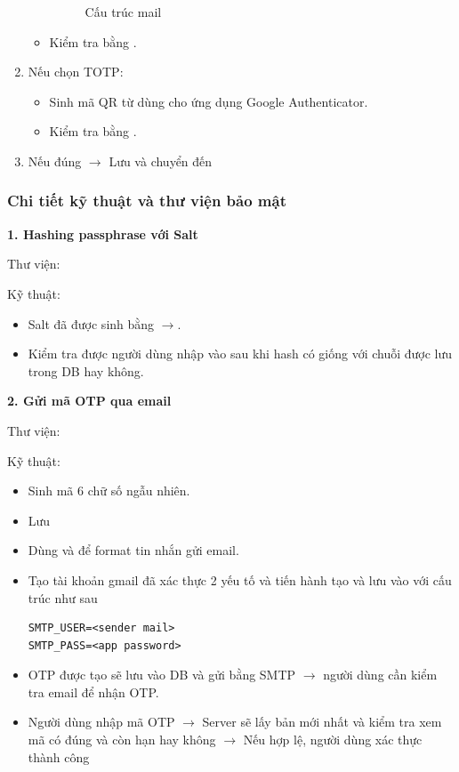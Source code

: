 \begin{enumerate}
\begin{itemize}
\begin{figure}[H]
        \caption{Cấu trúc mail}
        \label{fig:mail_recovery_ui}
        \end{figure}
        \item Kiểm tra bằng .
    \end{itemize}
    \item Nếu chọn TOTP:
    \begin{itemize}
        \item Sinh mã QR từ  \textrightarrow{} dùng cho ứng dụng Google Authenticator.
        \item Kiểm tra bằng .
    \end{itemize}
    \item Nếu đúng $\rightarrow$ Lưu  và chuyển đến 
\end{enumerate}

\subsubsection*{Chi tiết kỹ thuật và thư viện bảo mật}
\textbf{1. Hashing passphrase với Salt}

Thư viện:  

Kỹ thuật:
\begin{itemize}
    \item Salt đã được sinh bằng  $\rightarrow$.
    \item Kiểm tra  được người dùng nhập vào sau khi hash có giống với chuỗi được lưu trong DB hay không.
\end{itemize}

\textbf{2. Gửi mã OTP qua email}

Thư viện:  

Kỹ thuật:
\begin{itemize}
    \item Sinh mã 6 chữ số ngẫu nhiên.
    \item Lưu 
    \item Dùng  và  để format tin nhắn gửi email.
    \item Tạo tài khoản gmail đã xác thực 2 yếu tố và tiến hành tạo  và lưu vào  với cấu trúc như sau
\begin{lstlisting}
SMTP_USER=<sender mail>
SMTP_PASS=<app password>
\end{lstlisting}
    \item OTP được tạo sẽ lưu vào DB và gửi bằng SMTP $\rightarrow$ người dùng cần kiểm tra email để nhận OTP.
    \item Người dùng nhập mã OTP $\rightarrow$ Server sẽ lấy bản  mới nhất và kiểm tra xem mã có đúng và còn hạn hay không $\rightarrow$ Nếu hợp lệ, người dùng xác thực thành công
\end{itemize}

